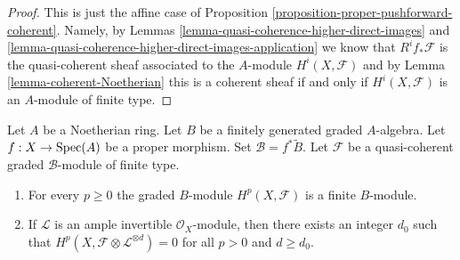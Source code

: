 \begin{proof}
This is just the affine case of
Proposition \ref{proposition-proper-pushforward-coherent}.
Namely, by Lemmas \ref{lemma-quasi-coherence-higher-direct-images} and
\ref{lemma-quasi-coherence-higher-direct-images-application} we know that
$R^if_*\mathcal{F}$ is the quasi-coherent sheaf associated
to the $A$-module $H^i(X, \mathcal{F})$
and by Lemma \ref{lemma-coherent-Noetherian} this is
a coherent sheaf if and only if $H^i(X, \mathcal{F})$
is an $A$-module of finite type.
\end{proof}

\begin{lemma}
\label{lemma-graded-finiteness}
Let $A$ be a Noetherian ring.
Let $B$ be a finitely generated graded $A$-algebra.
Let $f : X \to \mathop{\mathrm{Spec}}(A)$ be a proper morphism.
Set $\mathcal{B} = f^*\widetilde B$.
Let $\mathcal{F}$ be a quasi-coherent
graded $\mathcal{B}$-module of finite type.
\begin{enumerate}
\item For every $p \geq 0$ the graded $B$-module $H^p(X, \mathcal{F})$
is a finite $B$-module.
\item If $\mathcal{L}$ is an ample invertible $\mathcal{O}_X$-module,
then there exists an integer $d_0$ such that
$H^p(X, \mathcal{F} \otimes \mathcal{L}^{\otimes d}) = 0$
for all $p > 0$ and $d \geq d_0$.
\end{enumerate}
\end{lemma}


